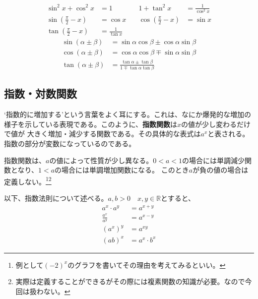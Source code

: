 \documentclass[a4j,dvipdfmx]{jsarticle}
\begin{document}
                \begin{align}
                    \sin^2 x + \cos ^2 x &= 1 &\quad 1 + \tan^2 x &= \frac{1}{\cos^2 x}\\
                    \sin\left(\frac{\pi}{2}-x\right) &= \cos x &\quad \cos\left(\frac{\pi}{2}-x\right) &= \sin x\\
                    \tan\left(\frac{\pi}{2}-x\right) &= \frac{1}{\tan x} &&
                \end{align}
                \begin{align}
                    \sin(\alpha\pm\beta) &= \sin\alpha\cos\beta \pm \cos\alpha\sin\beta\\
                    \cos(\alpha\pm\beta) &= \cos\alpha\cos\beta \mp \sin\alpha\sin\beta\\
                    \tan(\alpha\pm\beta) &= \frac{\tan\alpha\pm\tan\beta}{1\mp\tan\alpha\tan\beta}
                \end{align}
            \clearpage
            \subsection{指数・対数関数}
                `指数的に増加する'という言葉をよく耳にする。これは、なにか爆発的な増加の様子を示している表現である。このように、\textbf{指数関数}は$x$の値が少し変わるだけで値が
                大きく増加・減少する関数である。その具体的な表式は$a^x$と表される。指数の部分が変数になっているのである。

                指数関数は、$a$の値によって性質が少し異なる。$0<a<1$の場合には単調減少関数となり、$1<a$の場合には単調増加関数になる。
                このとき$a$が負の値の場合は定義しない。\footnote{例として$(-2)^x$のグラフを書いてその理由を考えてみるといい。}\footnote{実際は定義することができるがその際には複素関数の知識が必要。なので今回は扱わない。}

                以下、指数法則について述べる。$a,b>0\quad x,y\in \mathbb{R}$とすると、
                \begin{align}
                    a^x\cdot a^y&=a^{x+y}\\
                    \frac{a^x}{a^y} &= a^{x-y}\\
                    (a^x)^y &= a^{xy}\\
                    (ab)^{x} &= a^x\cdot b^x
                \end{align}
\end{document}
